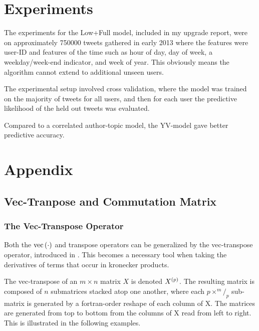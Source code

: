 \section{Experiments}

The experiments for the Low+Full model, included in my upgrade report, were on approximately 750000 tweets gathered in early 2013 where the features were user-ID and features of the time such as hour of day, day of week, a weekday/week-end indicator, and week of year. This obviously means the algorithm cannot extend to additional unseen users.

The experimental setup involved cross validation, where the model was trained on the majority of tweets for all users, and then for each user the predictive likelihood of the held out tweets was evaluated. 

Compared to a correlated author-topic model, the YV-model gave better predictive accuracy.



\section{Appendix}
\subsection{Vec-Tranpose and Commutation Matrix}
\subsubsection{The Vec-Transpose Operator}
Both the $\text{vec}\left(\cdot\right)$ and transpose operators can be generalized by the vec-transpose operator, introduced in \cite{Wandell1992}. This becomes a necessary tool when taking the derivatives of terms that occur in kronecker products.

The vec-transpose of an $m \times n$ matrix $X$ is denoted ${ X^{(p)} }$. The resulting matrix is composed of $n$ submatrices stacked atop one another, where each $p \times ^m/_p$ sub-matrix is generated by a fortran-order reshape of each column of X. The matrices are generated from top to bottom from the columns of X read from left to right. This is illustrated in the following examples.

